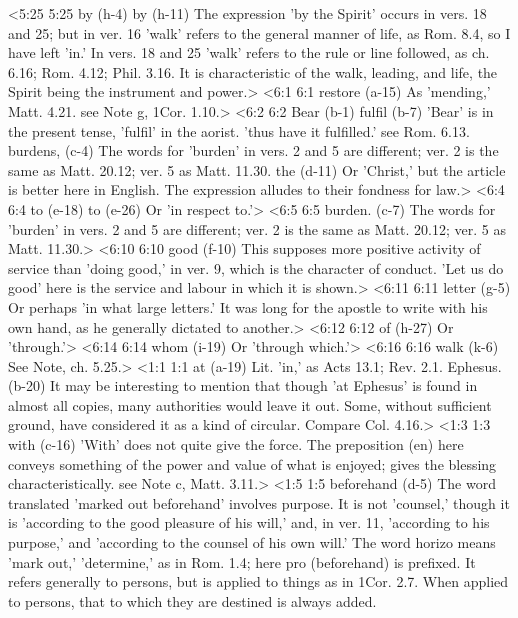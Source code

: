 <5:25 5:25  by (h-4)  by (h-11)
  The expression 'by the Spirit' occurs in vers. 18 and 25; but  in ver. 16 'walk' refers to the general manner of life, as Rom.  8.4, so I have left 'in.' In vers. 18 and 25 'walk' refers to  the rule or line followed, as ch. 6.16; Rom. 4.12; Phil. 3.16.  It is characteristic of the walk, leading, and life, the Spirit  being the instrument and power.>
<6:1 6:1  restore (a-15)  As 'mending,' Matt. 4.21. see Note g, 1Cor. 1.10.>
<6:2 6:2  Bear (b-1)  fulfil (b-7)
  'Bear' is in the present tense, 'fulfil' in the aorist. 'thus  have it fulfilled.' see Rom. 6.13.
  burdens, (c-4)  The words for 'burden' in vers. 2 and 5 are different; ver. 2  is the same as Matt. 20.12; ver. 5 as Matt. 11.30.
  the (d-11)  Or 'Christ,' but the article is better here in English. The  expression alludes to their fondness for law.>
<6:4 6:4  to (e-18)  to (e-26)
  Or 'in respect to.'>
<6:5 6:5  burden. (c-7)  The words for 'burden' in vers. 2 and 5 are different; ver. 2  is the same as Matt. 20.12; ver. 5 as Matt. 11.30.>
<6:10 6:10  good (f-10)  This supposes more positive activity of service than 'doing  good,' in ver. 9, which is the character of conduct. 'Let us do  good' here is the service and labour in which it is shown.>
<6:11 6:11  letter (g-5)  Or perhaps 'in what large letters.' It was long for the  apostle to write with his own hand, as he generally dictated to  another.>
<6:12 6:12  of (h-27)  Or 'through.'>
<6:14 6:14  whom (i-19)  Or 'through which.'>
<6:16 6:16  walk (k-6)  See Note, ch. 5.25.>
<1:1 1:1  at (a-19)  Lit. 'in,' as Acts 13.1; Rev. 2.1.
  Ephesus. (b-20)  It may be interesting to mention that though 'at Ephesus' is  found in almost all copies, many authorities would leave it  out. Some, without sufficient ground, have considered it as a  kind of circular. Compare Col. 4.16.>
<1:3 1:3  with (c-16)  'With' does not quite give the force. The preposition (en)  here conveys something of the power and value of what is  enjoyed; gives the blessing characteristically. see Note c,  Matt. 3.11.>
<1:5 1:5  beforehand (d-5)  The word translated 'marked out beforehand' involves purpose.  It is not 'counsel,' though it is 'according to the good  pleasure of his will,' and, in ver. 11, 'according to his  purpose,' and 'according to the counsel of his own will.' The  word horizo means 'mark out,' 'determine,' as in Rom. 1.4;  here pro (beforehand) is prefixed. It refers generally to  persons, but is applied to things as in 1Cor. 2.7. When applied  to persons, that to which they are destined is always added.
